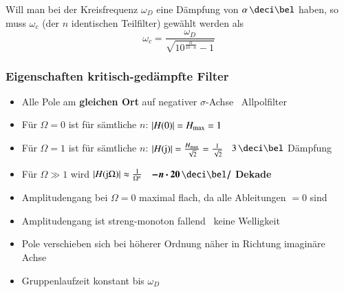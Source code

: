 \vspace{0.2cm}
Will man bei der Kreisfrequenz $\omega_D$ eine Dämpfung von $\alpha \, \deci \bel$ haben, so muss $\omega_c$ (der $n$ identischen
Teilfilter) gewählt werden als
$$ \boxed{ \omega_c = \frac{\omega_D}{\sqrt{10^{\frac{\alpha}{10 \cdot n}} -1}} } $$ 


\subsubsection{Eigenschaften kritisch-gedämpfte Filter}

\begin{itemize}
    \item Alle Pole am \textbf{gleichen Ort} auf negativer $\sigma$-Achse \textrightarrow\ Allpolfilter
    \item Für $\Omega = 0$ ist für sämtliche $n$: $|H(0)| = H_{\rm max} = 1$
    \item Für $\Omega = 1$ ist für sämtliche $n$: $|H(\mathrm{j})| = \frac{H_{\rm max}}{\sqrt{2}} = \frac{1}{\sqrt{2}}$
        \textrightarrow\ $3 \, \deci \bel$ Dämpfung
    \item Für $\Omega \gg 1$ wird $|H(\mathrm{j} \Omega)| \approx \frac{1}{\Omega^n}$ \textrightarrow\ $\bm{- n \cdot 20 \, \deci \bel /}$ \textbf{Dekade}
    \item Amplitudengang bei $\Omega = 0$ maximal flach, da alle Ableitungen $=0$ sind
    \item Amplitudengang ist streng-monoton fallend \textrightarrow\ keine Welligkeit
    \item Pole verschieben sich bei höherer Ordnung näher in Richtung imaginäre Achse
    \item Gruppenlaufzeit konstant bis $\omega_D$
\end{itemize}


